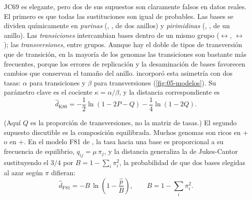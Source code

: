 JC69 es elegante, pero dos de sus supuestos son claramente falsos en datos reales. El primero es que todas las sustituciones son igual de probables. Las bases se dividen químicamente en \emph{purinas} (, , de dos anillos) y \emph{pirimidinas} (, , de un anillo). Las \emph{transiciones} intercambian bases dentro de un mismo grupo ($\leftrightarrow$, $\leftrightarrow$); las \emph{transversiones}, entre grupos. Aunque hay el doble de tipos de transversión que de transición, en la mayoría de los genomas las transiciones son bastante más frecuentes, porque los errores de replicación y la desaminación de bases favorecen cambios que conservan el tamaño del anillo. \textcite{c05-kimura1980} incorporó esta asimetría con dos tasas: $\alpha$ para transiciones y $\beta$ para transversiones (\cref{fig:05-modelos}). Su parámetro clave es el cociente $\kappa=\alpha/\beta$, y la distancia correspondiente es
\begin{equation}\label{eq:05-k80}
\hat d_{\text{K80}} = -\frac12\ln\!\left(1-2P-Q\right) - \frac14\ln\!\left(1-2Q\right).
\end{equation}

\begin{simbolos}
\end{simbolos}

(Aquí $Q$ es la proporción de transversiones, no la matriz de tasas.) El segundo supuesto discutible es la composición equilibrada. Muchos genomas son ricos en + o en +. En el modelo F81 de \textcite{c05-felsenstein1981}, la tasa hacia una base es proporcional a su frecuencia de equilibrio, $q_{ij}=\mu\,\pi_j$, y la distancia generaliza la de Jukes-Cantor sustituyendo el $3/4$ por $B=1-\sum_i\pi_i^2$, la probabilidad de que dos bases elegidas al azar según $\pi$ difieran:
\begin{equation}\label{eq:05-f81}
\hat d_{\text{F81}} = -B\,\ln\!\left(1-\frac{\hat p}{B}\right),\qquad B = 1-\sum_i\pi_i^2.
\end{equation}

\begin{simbolos}
\end{simbolos}

